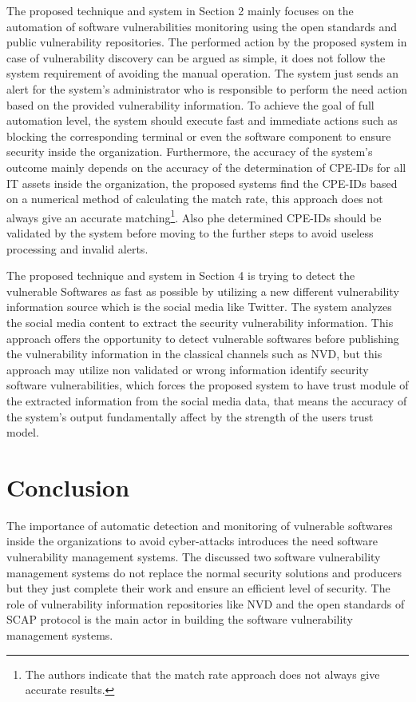 \documentclass{llncs}
\begin{document}
\par The proposed technique and system in Section 2 mainly focuses on the automation of software vulnerabilities monitoring using the open standards and public vulnerability repositories. The performed action by the proposed system in case of vulnerability discovery can be argued as simple, it does not follow the system requirement of avoiding the manual operation. The system just sends an alert for the system's administrator who is responsible  to perform the need action based on the provided vulnerability information. To achieve the goal of full automation level, the system should execute fast and immediate actions such as  blocking the corresponding terminal or even the software component to ensure security inside the organization. Furthermore, the accuracy of the system's outcome mainly depends on the accuracy of the determination of CPE-IDs for all IT assets inside the organization, the proposed systems find the CPE-IDs based on a numerical method of calculating the match rate, this approach does not always give an accurate matching\footnote{ The authors indicate that the match rate approach does not always give accurate results.}. Also phe determined CPE-IDs should be validated by the system before moving to the further steps to avoid useless processing and invalid alerts.


\par The proposed technique and system in Section 4 is trying to detect the vulnerable Softwares as fast as possible by utilizing a new different vulnerability information source which is the social media like Twitter. The system analyzes the social media content to extract the security vulnerability information. This approach offers the opportunity to detect vulnerable softwares before publishing the vulnerability information in the classical channels such as NVD, but this approach may utilize non validated or wrong information identify security software vulnerabilities, which forces the proposed system to  have trust module of the extracted information from the social media data, that means the accuracy of the system's output fundamentally affect by the strength of the users trust model.
      
\section{Conclusion}

\par The importance of automatic detection and monitoring of vulnerable softwares inside the organizations to avoid cyber-attacks introduces the need software vulnerability management systems. The discussed two software vulnerability management systems do not replace the normal security solutions and producers but they just complete their work and ensure an efficient level of security. The role of vulnerability information repositories like NVD and the open standards of SCAP protocol is the main actor in building the software vulnerability management systems.   
\end{document}
